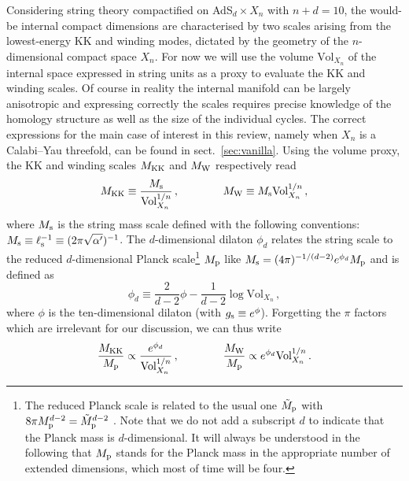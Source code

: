 \documentclass[11pt, a4paper]{article}
\newcommand{\MK}{M_{\rm KK}}
\newcommand{\MW}{M_{\rm W}}
\newcommand{\Mp}{M_{\rm p}}
\begin{document}
Considering string theory compactified on AdS$_d\times X_n$ with $n+d=10$, the would-be internal compact dimensions are characterised by two scales arising from the lowest-energy KK and winding modes, dictated by the geometry of the $n$-dimensional compact space $X_n$. For now we will use the volume $\text{Vol}_{X_n}$ of the internal space expressed in string units as a proxy to evaluate the KK and winding scales. Of course in reality the internal manifold can be largely anisotropic and expressing correctly the scales requires precise knowledge of the homology structure as well as the size of the individual cycles. The correct expressions for the main case of interest in this review, namely when $X_n$ is a Calabi--Yau threefold, can be found in sect.~\ref{sec:vanilla}. Using the volume proxy, the KK and winding scales $\MK$ and $\MW$ respectively read
\begin{equation}
\MK\equiv\frac{M_{\rm s}}{\text{Vol}_{X_n}^{1/n}}\, ,\qquad\qquad \MW\equiv M_{\rm s}{\text{Vol}_{X_n}^{1/n}}\, ,
\end{equation}
%
where $M_{\rm s}$ is the string mass scale defined with the following conventions: $M_{\rm s}\equiv\ell_{\rm s}^{-1}\equiv (2\pi\sqrt{\alpha'})^{-1}$. The $d$-dimensional dilaton $\phi_d$ relates the string scale to the reduced $d$-dimensional Planck scale\footnote{The reduced Planck scale is related to the usual one $\tilde\Mp$ with $8\pi\Mp^{d-2}=\tilde\Mp^{d-2}$ \cite{Polchinski:1998rq,Polchinski:2010hw}. Note that we do not add a subscript $d$ to indicate that the Planck mass is $d$-dimensional. It will always be understood in the following that $\Mp$ stands for the Planck mass in the appropriate number of extended dimensions, which most of time will be four.} $\Mp$ like $M_{\rm s}=(4\pi)^{-1/(d-2)}e^{\phi_d}\Mp$ and is defined as
\begin{equation}
\phi_d\equiv\frac{2}{d-2}\phi-\frac{1}{d-2}\log\text{Vol}_{X_n}\, ,
\end{equation}
%
where $\phi$ is the ten-dimensional dilaton (with $g_{\rm s}\equiv e^\phi$). Forgetting the $\pi$ factors which are irrelevant for our discussion, we can thus write
\begin{equation}
\label{eq:KKW}
\frac{\MK}{\Mp}\propto\frac{e^{\phi_d}}{\text{Vol}_{X_n}^{1/n}}\, ,\qquad\qquad \frac{\MW}{\Mp}\propto e^{\phi_d}\text{Vol}_{X_n}^{1/n}\, .
\end{equation}
\end{document}
